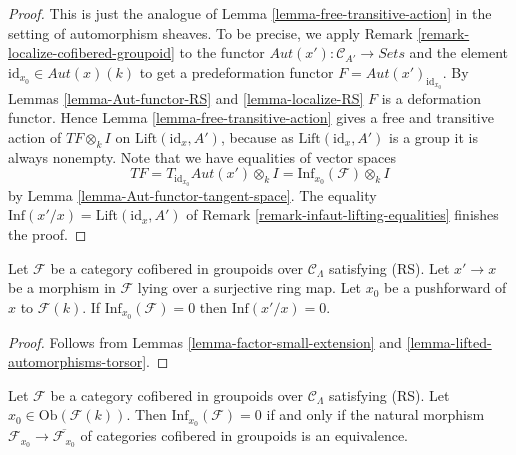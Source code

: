 \begin{proof}
This is just the analogue of
Lemma \ref{lemma-free-transitive-action}
in the setting of automorphism sheaves.
To be precise, we apply
Remark \ref{remark-localize-cofibered-groupoid}
to the functor $\mathit{Aut}(x') : \mathcal{C}_{A'} \to \textit{Sets}$
and the element $\text{id}_{x_0} \in \mathit{Aut}(x)(k)$ to get
a predeformation functor $F = \mathit{Aut}(x')_{\text{id}_{x_0}}$. By
Lemmas \ref{lemma-Aut-functor-RS} and \ref{lemma-localize-RS}
$F$ is a deformation functor. Hence
Lemma \ref{lemma-free-transitive-action}
gives a free and transitive action
of $TF \otimes_k I$ on $\text{Lift}(\text{id}_x, A')$, because as
$\text{Lift}(\text{id}_x, A')$ is a group it is always nonempty.
Note that we have equalities of vector spaces
$$
TF = T_{\text{id}_{x_0}} \mathit{Aut}(x') \otimes_k I =
\text{Inf}_{x_0}(\mathcal{F}) \otimes_k I
$$
by
Lemma \ref{lemma-Aut-functor-tangent-space}.
The equality $\text{Inf}(x'/x) = \text{Lift}(\text{id}_{x}, A')$ of
Remark \ref{remark-infaut-lifting-equalities}
finishes the proof.
\end{proof}

\begin{lemma}
\label{lemma-infaut-trivial}
Let $\mathcal{F}$ be a category cofibered in groupoids over
$\mathcal{C}_\Lambda$ satisfying (RS). Let $x' \to x$ be a morphism
in $\mathcal{F}$ lying over a surjective ring map. Let $x_0$ be a pushforward
of $x$ to $\mathcal{F}(k)$. If $\text{Inf}_{x_0}(\mathcal{F}) = 0$ then
$\text{Inf}(x'/x) = 0$.
\end{lemma}

\begin{proof}
Follows from
Lemmas \ref{lemma-factor-small-extension} and 
\ref{lemma-lifted-automorphisms-torsor}.
\end{proof}

\begin{lemma}
\label{lemma-infdef-trivial}
Let $\mathcal{F}$ be a category cofibered in groupoids over
$\mathcal{C}_\Lambda$ satisfying (RS). Let
$x_0 \in \text{Ob}(\mathcal{F}(k))$. Then $\text{Inf}_{x_0}(\mathcal{F}) = 0$
if and only if the natural morphism
$\mathcal{F}_{x_0} \to \overline{\mathcal{F}_{x_0}}$ of
categories cofibered in groupoids is an equivalence.
\end{lemma}

